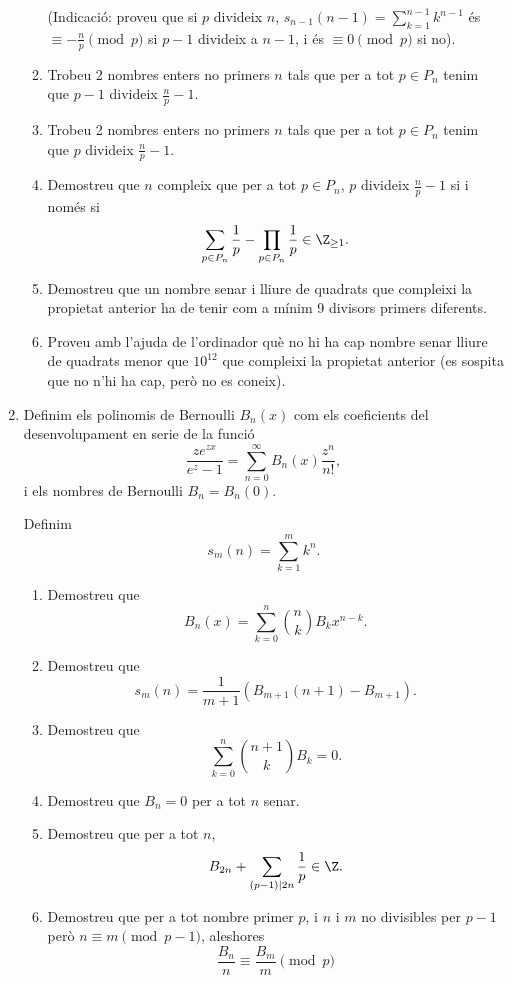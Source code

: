 \begin{enumerate}[leftmargin=*]
\begin{enumerate}
(Indicació: proveu que si $p$ divideix $n$, $s_{n-1}(n-1)=\sum_{k=1}^{n-1}
k^{n-1}$ és $\equiv -\frac np\pmod{p}$ si $p-1$ divideix a $n-1$, i
és $\equiv 0\pmod{p}$ si no).
\item Trobeu 2 nombres enters no primers $n$ tals que per a tot $p\in P_n$
tenim que $p-1$ divideix $\frac np -1$.
\item Trobeu 2 nombres enters no primers $n$ tals que per a tot $p\in P_n$
tenim que $p$ divideix $\frac np -1$.
\item Demostreu que $n$ compleix que per a tot $p\in P_n$,
$p$ divideix $\frac np -1$ si i només si
$$\sum_{p\in P_n}\frac 1p -\prod_{p\in P_n}\frac 1p \in \Z_{\ge 1}.$$
\item Demostreu que un nombre senar i lliure de quadrats que
compleixi la propietat anterior ha de tenir com a mínim 9 divisors
primers diferents.
\item Proveu amb l'ajuda de l'ordinador qu\`{e} no hi ha cap nombre
senar lliure de quadrats menor que $10^{12}$ que compleixi la
propietat anterior (es sospita que no n'hi ha cap, però no es
coneix).
\end{enumerate}



\item Definim els polinomis de Bernoulli $B_{n}(x)$ com els
coeficients del desenvolupament en serie de la funció
$$\frac{ze^{zx}}{e^z-1}=\sum_{n=0}^{\infty} B_n(x) \frac{z^n}{n!},$$
i els nombres de Bernoulli $B_n=B_n(0)$.

Definim $$s_m(n)=\sum_{k=1}^{m} k^{n}.$$

\begin{enumerate}
\item Demostreu que $$B_n(x)=\sum_{k=0}^n \binom{n}{k} B_k
x^{n-k}.$$
\item Demostreu que
$$s_m(n)=\frac{1}{m+1}(B_{m+1}(n+1)-B_{m+1}).$$
\item Demostreu que
$$\sum_{k=0}^n \binom{n+1}{k} B_k=0.$$
\item Demostreu que $B_n=0$ per a tot $n$ senar.
\item Demostreu que per a tot $n$,
$$B_{2n}+\sum_{(p-1)\mid 2n} \frac 1p \in \Z.$$
\item Demostreu que per a tot nombre primer $p$, i $n$ i $m$ no
divisibles per $p-1$ però $n\equiv m \pmod{p-1}$, aleshores
$$\frac{B_n}{n}\equiv \frac{B_m}{m} \pmod{p}$$
\end{enumerate}



\end{enumerate}
